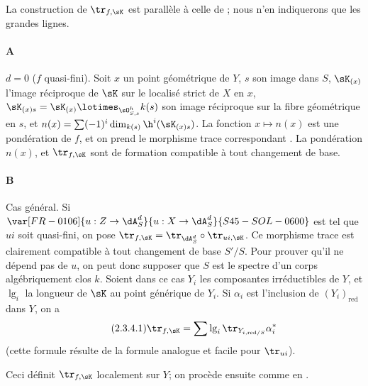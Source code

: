 \subsubsection{}\label{IV:2-3-4}

La construction de $\tr_{f,\sK}$ est parallèle à celle de 
; nous n'en indiquerons que les grandes lignes.

\paragraph{A}
$d=0$ ($f$ quasi-fini). Soit $x$ un point géométrique de $Y$, $s$ son image 
dans $S$, $\sK_{(x)}$ l'image réciproque de $\sK$ sur le localisé strict 
de $X$ en $x$, $\sK_{(x)s} = \sK_{(x)}\lotimes_{\sO_{S,s}^h} k(s)$ son image 
réciproque sur la fibre géométrique en $s$, et 
$n(x)=\sum (-1)^i \dim_{k(s)} \h^i(\sK_{(x)s})$. La fonction $x\mapsto n(x)$ 
est une pondération de $f$, et on prend le morphisme trace correspondant 
. La pondération $n(x)$, et $\tr_{f,\sK}$ sont de 
formation compatible à tout changement de base. 

\paragraph{B}
Cas général. Si $\var[FR-0106]{u:Z\to \dA_S^d}{u:X\to \dA_S^d}{S45-SOL-0600}$ est tel que $u i$ soit quasi-fini, on pose 
$\tr_{f,\sK} = \tr_{\dA_S^d}\circ \tr_{u i,\sK}$. Ce morphisme trace est 
clairement compatible à tout changement de base $S'/S$. Pour prouver qu'il ne 
dépend pas de $u$, on peut donc supposer que $S$ est le spectre d'un corps 
algébriquement clos $k$. Soient dans ce cas $Y_i$ les composantes 
irréductibles de $Y$, et $\operatorname{lg}_i$ la longueur de $\sK$ au 
point générique de $Y_i$. Si $\alpha_i$ est l'inclusion de 
$(Y_i)_\text{red}$ dans $Y$, on a 
\begin{equation*}\tag{2.3.4.1}\label{IV:eq:2-3-4}
  \tr_{f,\sK} = \sum \operatorname{lg}_i \tr_{Y_{i,\text{red}/S}} \alpha_i^\ast
\end{equation*}
(cette formule résulte de la formule analogue et facile pour $\tr_{u i}$). 

Ceci définit $\tr_{f,\sK}$ localement sur $Y$; on procède ensuite comme en 
. 





